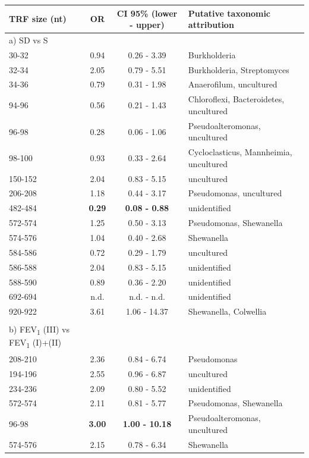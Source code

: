 \begin{table}
\centering
\tiny
\begin{tabular}{l c c l}
\hline
TRF size (nt) & OR & CI 95\% (lower - upper) & Putative taxonomic attribution \\
\hline\hline
a) SD vs S &  &  &  \\	
\hline
30-32 & 0.94 & 0.26 - 3.39 & Burkholderia \\
32-34 & 2.05 & 0.79 - 5.51 & Burkholderia, Streptomyces \\
34-36 & 0.79 & 0.31 - 1.98 & Anaerofilum, uncultured \\
94-96 & 0.56 & 0.21 - 1.43 & Chloroflexi, Bacteroidetes, uncultured \\
96-98 & 0.28 & 0.06 - 1.06 & Pseudoalteromonas, uncultured \\
98-100 & 0.93 & 0.33 - 2.64 & Cycloclasticus, Mannheimia, uncultured \\
150-152 & 2.04 & 0.83 - 5.15 & uncultured \\
206-208 & 1.18 & 0.44 - 3.17 & Pseudomonas, uncultured \\
482-484 & \textbf{0.29} & \textbf{0.08 - 0.88} & unidentified \\
572-574 & 1.25 & 0.50 - 3.13 & Pseudomonas, Shewanella \\
574-576 & 1.04 & 0.40 - 2.68 & Shewanella \\
584-586 & 0.72 & 0.29 - 1.79 & uncultured \\
586-588 & 2.04 & 0.83 - 5.15 & unidentified \\
588-590 & 0.89 & 0.36 - 2.20 & unidentified \\
692-694 & n.d. & n.d. - n.d. & unidentified \\
920-922 & 3.61 & 1.06 - 14.37 & Shewanella, Colwellia \\
 &  &  & \\
b) FEV\textsubscript{1} (III) vs FEV\textsubscript{1} (I)+(II) &  &  \\
\hline
208-210 & 2.36 & 0.84 - 6.74 & Pseudomonas \\
194-196 & 2.55 & 0.96 - 6.87 & uncultured \\
234-236 & 2.09 & 0.80 - 5.52 & unidentified \\
572-574 & 2.11 & 0.81 - 5.77 & Pseudomonas, Shewanella \\
96-98 & \textbf{3.00} & \textbf{1.00 - 10.18} & Pseudoalteromonas, uncultured \\
574-576 & 2.15 & 0.78 - 6.34 & Shewanella \\

\end{tabular}
\end{table}
